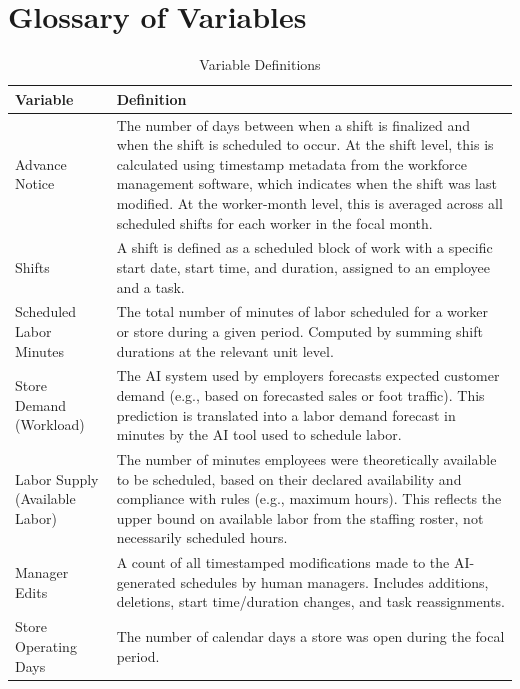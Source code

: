 \documentclass[letterpaper,11pt,leqno]{article}
\theoremstyle{paper}
\begin{document}
\section{Glossary of Variables} \label{sec:glossary_of_variables}

\begin{table}[H]
\scriptsize
\singlespacing
\centering
\caption{Variable Definitions}
\begin{tabular}{p{5cm}p{11cm}}
\toprule
\textbf{Variable} & \textbf{Definition} \\
\midrule
Advance Notice & The number of days between when a shift is finalized and when the shift is scheduled to occur. At the shift level, this is calculated using timestamp metadata from the workforce management software, which indicates when the shift was last modified. At the worker-month level, this is averaged across all scheduled shifts for each worker in the focal month. \\

Shifts & A shift is defined as a scheduled block of work with a specific start date, start time, and duration, assigned to an employee and a task.  \\

Scheduled Labor Minutes & The total number of minutes of labor scheduled for a worker or store during a given period. Computed by summing shift durations at the relevant unit level. \\

Store Demand (Workload) & The AI system used by employers forecasts expected customer demand (e.g., based on forecasted sales or foot traffic). This prediction is translated into a labor demand forecast in minutes by the AI tool used to schedule labor. \\[6pt]

Labor Supply (Available Labor) & The number of minutes employees were theoretically available to be scheduled, based on their declared availability and compliance with rules (e.g., maximum hours). This reflects the upper bound on available labor from the staffing roster, not necessarily scheduled hours. \\

Manager Edits & A count of all timestamped modifications made to the AI-generated schedules by human managers. Includes additions, deletions, start time/duration changes, and task reassignments. \\

Store Operating Days & The number of calendar days a store was open during the focal period. \\[6pt]


\end{tabular}
\end{table}
\end{document}
